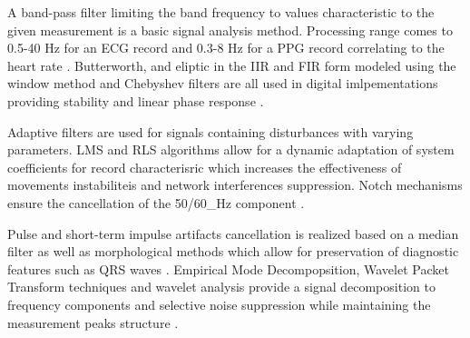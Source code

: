 \documentclass[journal]{IEEEtran}
\begin{document}
{%
A band-pass filter limiting the band frequency to values characteristic to the given measurement is a basic signal analysis method. Processing range comes to 0.5-40 Hz for an ECG record and 0.3-8 Hz for a PPG record correlating to the heart rate \cite{3}. Butterworth, and eliptic in the IIR and FIR form modeled using the window method and Chebyshev filters are all used in digital imlpementations providing stability and linear phase response \cite{4}.

Adaptive filters are used for signals containing disturbances with varying parameters. LMS and RLS algorithms allow for a dynamic adaptation of system coefficients for record characterisric which increases the effectiveness of movements instabiliteis and network interferences suppression. Notch mechanisms ensure the cancellation of the 50/60_Hz component \cite{5}.

\newpage
Pulse and short-term impulse artifacts cancellation is realized based on a median filter as well as morphological methods which allow for preservation of diagnostic features such as QRS waves \cite{6}. Empirical Mode Decompopsition, Wavelet Packet Transform techniques and wavelet analysis provide a signal decomposition to frequency components and selective noise suppression while maintaining the measurement peaks structure \cite{7}.

}
\end{document}
